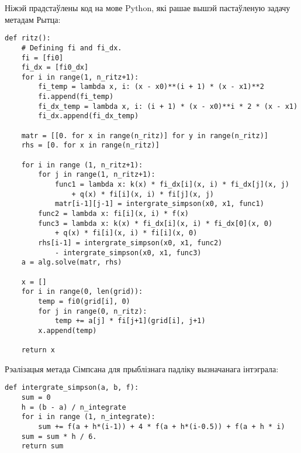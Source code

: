 Ніжэй прадстаўлены код на мове Python, які рашае вышэй пастаўленую задачу метадам Рытца:
\begin{verbatim}
def ritz():
    # Defining fi and fi_dx.
    fi = [fi0]
    fi_dx = [fi0_dx]
    for i in range(1, n_ritz+1):
        fi_temp = lambda x, i: (x - x0)**(i + 1) * (x - x1)**2
        fi.append(fi_temp)
        fi_dx_temp = lambda x, i: (i + 1) * (x - x0)**i * 2 * (x - x1)
        fi_dx.append(fi_dx_temp)

    matr = [[0. for x in range(n_ritz)] for y in range(n_ritz)]
    rhs = [0. for x in range(n_ritz)]

    for i in range (1, n_ritz+1):
        for j in range(1, n_ritz+1):
            func1 = lambda x: k(x) * fi_dx[i](x, i) * fi_dx[j](x, j)
                + q(x) * fi[i](x, i) * fi[j](x, j)
            matr[i-1][j-1] = intergrate_simpson(x0, x1, func1)
        func2 = lambda x: fi[i](x, i) * f(x)
        func3 = lambda x: k(x) * fi_dx[i](x, i) * fi_dx[0](x, 0)
            + q(x) * fi[i](x, i) * fi[i](x, 0)
        rhs[i-1] = intergrate_simpson(x0, x1, func2)
            - intergrate_simpson(x0, x1, func3)
    a = alg.solve(matr, rhs)

    x = []
    for i in range(0, len(grid)):
        temp = fi0(grid[i], 0)
        for j in range(0, n_ritz):
            temp += a[j] * fi[j+1](grid[i], j+1)
        x.append(temp)

    return x
\end{verbatim}

Рэалізацыя метада Сімпсана для прыблізнага падліку вызначанага інтэграла:
\begin{verbatim}
def intergrate_simpson(a, b, f):
    sum = 0
    h = (b - a) / n_integrate
    for i in range (1, n_integrate):
        sum += f(a + h*(i-1)) + 4 * f(a + h*(i-0.5)) + f(a + h * i)
    sum = sum * h / 6.
    return sum
\end{verbatim}
